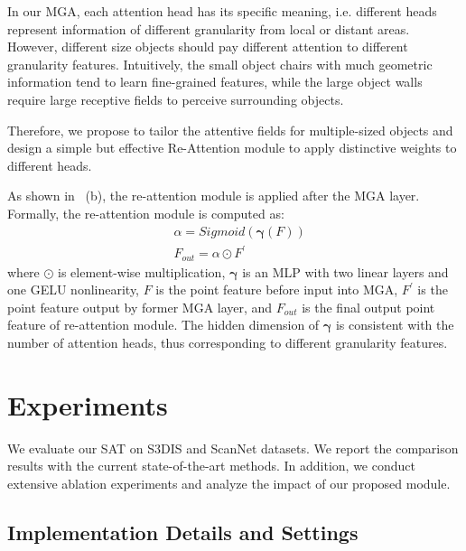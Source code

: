 \documentclass[10pt,twocolumn,letterpaper]{article}
\begin{document}
In our MGA, each attention head has its specific meaning, i.e. different heads represent information of different granularity from local or distant areas. However, different size objects should pay different attention to different granularity features. Intuitively, the small object chairs with much geometric information tend to learn fine-grained features, while the large object walls require large receptive fields to perceive surrounding objects.


Therefore, we propose to tailor the attentive fields for multiple-sized objects and design a simple but effective Re-Attention module to apply distinctive weights to different heads.

As shown in~ (b), the re-attention module is applied after the MGA layer. Formally, the re-attention module is computed as:
\begin{equation}
\begin{split}\label{equa-reattention}
& \alpha = Sigmoid(\boldsymbol{\gamma}(F))\\
& F_{out} = \alpha \odot F^{'}
\end{split}
\end{equation}
where $\odot$ is element-wise multiplication, $\boldsymbol{\gamma}$ is an MLP with two linear layers and one GELU nonlinearity, $F$ is the point feature before input into MGA, $F^{'}$ is the point feature output by former MGA layer, and $F_{out}$ is the final output point feature of re-attention module. The hidden dimension of $\boldsymbol{\gamma}$ is consistent with the number of attention heads, thus corresponding to different granularity features.






\section{Experiments}\label{Sec-Exp}
We evaluate our SAT on S3DIS\cite{datasets3dis} and ScanNet\cite{datasetscannet} datasets. We report the comparison results with the current state-of-the-art methods. In addition, we conduct extensive ablation experiments and analyze the impact of our proposed module.

\subsection{Implementation Details and Settings}\label{sec-4.1}
\end{document}
